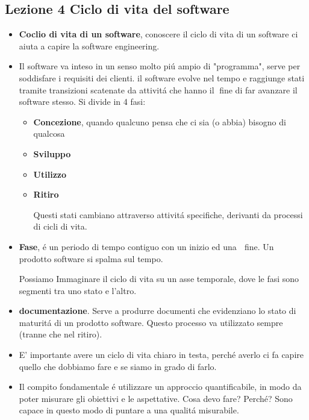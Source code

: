 \documentclass[10pt]{article}
\begin{document}
\begin{itemize}
\section{Lezione 4 Ciclo di vita del software}
\begin{itemize}
	\item \textbf{Coclio di vita di un software}, conoscere il ciclo di vita di 
	un software ci aiuta a capire la software engineering. 
	
	
	
	\item Il software va inteso in un senso molto pi\'u ampio di "programma", 
	serve per soddisfare i requisiti dei clienti. il software evolve
	nel tempo e raggiunge stati tramite transizioni scatenate da attivit\'a che 
	hanno il fine di far avanzare il software stesso. Si divide in 4 fasi:
	\begin{itemize}
	\item \textbf{Concezione}, quando qualcuno pensa che ci sia (o abbia) 
	bisogno di qualcosa
	\item \textbf{Sviluppo}
	\item \textbf{Utilizzo}
	\item \textbf{Ritiro}
	
	Questi stati cambiano attraverso attivit\'a specifiche, derivanti da 
	processi di cicli di vita.
	
	\end{itemize}

	\item \textbf{Fase}, \'e un periodo di tempo contiguo con un inizio ed una 
	fine. Un prodotto software si spalma sul tempo.
	
	Possiamo Immaginare il ciclo di vita su un asse temporale, dove le fasi 
	sono segmenti tra uno stato e l'altro.
	
	\item \textbf{documentazione}. Serve a produrre documenti che evidenziano 
	lo stato di maturit\'a di un prodotto software. Questo processo va 
	utilizzato sempre (tranne che nel ritiro).
	
	\item E' importante avere un ciclo di vita chiaro in testa, perch\'e averlo 
	ci fa capire quello che dobbiamo fare e se siamo in grado di farlo. 
	
	\item Il compito fondamentale \'e utilizzare un approccio 
	quantificabile, in modo da poter misurare gli obiettivi e le aspettative. 
	Cosa devo fare? 
	Perch\'e? 
	Sono capace in questo modo di puntare a una qualit\'a misurabile.
	

\end{itemize}
\end{itemize}
\end{document}
